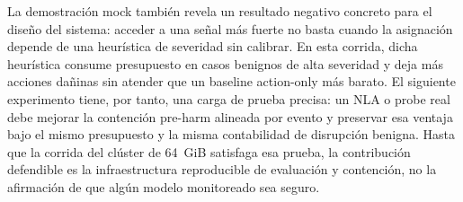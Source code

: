 \documentclass[10pt]{article}
\begin{document}
La demostración mock también revela un resultado negativo concreto para el
diseño del sistema: acceder a una señal más fuerte no basta cuando la asignación
depende de una heurística de severidad sin calibrar. En esta corrida, dicha
heurística consume presupuesto en casos benignos de alta severidad y deja más
acciones dañinas sin atender que un baseline action-only más barato. El
siguiente experimento tiene, por tanto, una carga de prueba precisa: un NLA o
probe real debe mejorar la contención pre-harm alineada por evento y preservar
esa ventaja bajo el mismo presupuesto y la misma contabilidad de disrupción
benigna. Hasta que la corrida del clúster de 64~GiB satisfaga esa prueba, la
contribución defendible es la infraestructura reproducible de evaluación y
contención, no la afirmación de que algún modelo monitoreado sea seguro.



\end{document}
